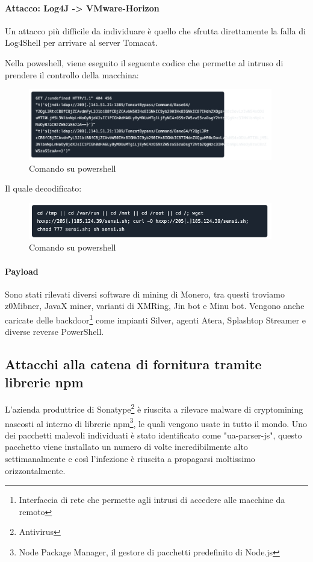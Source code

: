 \documentclass[12pt,a4paper]{article}
\begin{document}
\paragraph{Attacco: Log4J -> VMware-Horizon}
Un attacco più difficile da individuare è quello che sfrutta direttamente la
falla di Log4Shell per arrivare al server Tomacat.

Nella poweshell, viene eseguito il seguente codice che permette al intruso di
prendere il controllo della macchina:

\begin{figure}[ht]
    \centering
    \includegraphics[width=0.95\textwidth]{./images/powershell2.png}
    \caption{Comando su powershell}
    \label{fig:powershell_command2}
\end{figure}

Il quale decodificato:

\begin{figure}[ht]
    \centering
    \includegraphics[width=0.95\textwidth]{./images/powershell3.png}
    \caption{Comando su powershell}
    \label{fig:powershell_command3}
\end{figure}

\paragraph{Payload} Sono stati rilevati diversi software di mining di Monero,
tra questi troviamo z0Mibner, JavaX miner, varianti di XMRing, Jin bot e Minu
bot. Vengono anche caricate delle backdoor\footnote{Interfaccia di rete che
permette agli intrusi di accedere alle macchine da remoto} come impianti Silver,
agenti Atera, Splashtop Streamer e diverse reverse PowerShell.

\subsection{Attacchi alla catena di fornitura tramite librerie npm}
L'azienda produttrice di Sonatype\footnote{Antivirus} è riuscita a rilevare
malware di cryptomining nascosti al interno di librerie npm\footnote{Node
Package Manager, il gestore di pacchetti predefinito di Node.js}, le quali
vengono usate in tutto il mondo. Uno dei pacchetti malevoli individuati è stato
identificato come "ua-parser-js", questo pacchetto viene installato un numero di
volte incredibilmente alto settimanalmente e così l'infezione è riuscita a
propagarsi moltissimo orizzontalmente.
\end{document}
